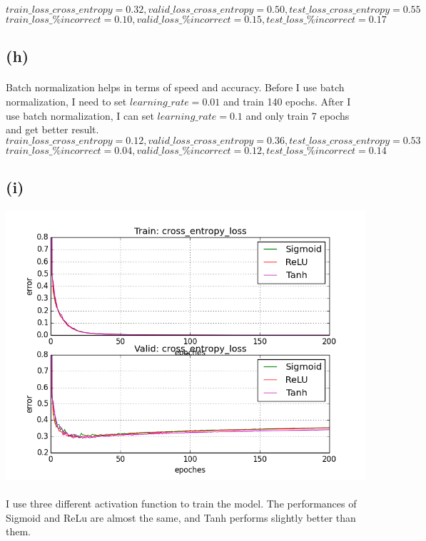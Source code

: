 \documentclass[twoside]{article}
\begin{document}
		$$train\_loss\_cross\_entropy =  0.32, valid\_loss\_cross\_entropy = 0.50,  test\_loss\_cross\_entropy = 0.55$$
		$$train\_loss\_\%incorrect = 0.10, valid\_loss\_\%incorrect = 0.15, test\_loss\_\%incorrect = 0.17$$

\subsection{(h)}
\paragraph{}Batch normalization helps in terms of speed and accuracy. Before I use batch normalization, I need to set $learning\_rate = 0.01$ and train 140 epochs. After I use batch normalization, I can set $learning\_rate = 0.1$ and only train 7 epochs and get better result. 
		$$train\_loss\_cross\_entropy =  0.12, valid\_loss\_cross\_entropy = 0.36,  test\_loss\_cross\_entropy = 0.53$$
		$$train\_loss\_\%incorrect = 0.04, valid\_loss\_\%incorrect = 0.12, test\_loss\_\%incorrect = 0.14$$



\subsection{(i)}
\includegraphics[width=0.5\linewidth]{images/problem_i}
\paragraph{}
I use three different activation function to train the model. The performances of Sigmoid and ReLu are almost the same, and Tanh performs slightly better than them.
\end{document}
